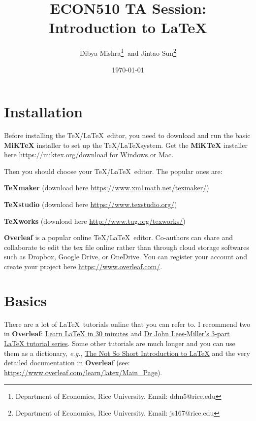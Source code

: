\documentclass[10pt]{extarticle}
\theoremstyle{theorem}
\theoremstyle{lemma}
\theoremstyle{proposition}
\theoremstyle{corollary}
\theoremstyle{assumption}
\theoremstyle{model}
\theoremstyle{property}
\theoremstyle{example}
\theoremstyle{algorithm}
\theoremstyle{definition}
\theoremstyle{axiom}
\theoremstyle{remark}
\begin{document}
\author{Dibya Mishra\thanks{%
Department of Economics, Rice University. Email: ddm5@rice.edu} $~$and Jintao Sun\thanks{%
Department of Economics, Rice University. Email: js167@rice.edu}}
\title{{\Large ECON510 TA Session: Introduction to \LaTeX}}
\date{\today}
\maketitle

\vspace*{-3em}


\section{Installation}

Before installing the \TeX/\LaTeX \ editor, you need to download and run the basic \textbf{MiKTeX} installer to set up the \TeX/\LaTeX system. Get the \textbf{MiKTeX} installer here \href{https://miktex.org/download}{https://miktex.org/download} for Windows or Mac.

Then you should choose your \TeX/\LaTeX \ editor. The popular ones are:

\textbf{TeXmaker} (download here \href{https://www.xm1math.net/texmaker/}{https://www.xm1math.net/texmaker/}) 

\textbf{TeXstudio} (download here \href{https://www.texstudio.org/}{https://www.texstudio.org/})

\textbf{TeXworks} (download here \href{http://www.tug.org/texworks/}{http://www.tug.org/texworks/})

\textbf{Overleaf} is a popular online \TeX/\LaTeX \ editor. Co-authors can share and collaborate to edit the tex file online rather than through cloud storage softwares such as Dropbox, Google Drive, or OneDrive. You can register your account and create your project here \href{https://www.overleaf.com/}{https://www.overleaf.com/}.


\section{Basics}

There are a lot of \LaTeX \ tutorials online that you can refer to. I recommend two in \textbf{Overleaf}: \href{https://www.overleaf.com/learn/latex/Learn_LaTeX_in_30_minutes}{Learn LaTeX in 30 minutes} and \href{https://www.overleaf.com/learn/latex/Free\_online\_introduction\_to\_LaTeX\_(part\_1)}{Dr John Lees-Miller's 3-part LaTeX tutorial series}. Some other tutorials are much longer and you can use them as a dictionary, \textit{e.g.}, \href{https://github.com/oetiker/lshort}{The Not So Short Introduction to LaTeX} and the very detailed documentation in \textbf{Overleaf} (see: \href{https://www.overleaf.com/learn/latex/Main\_Page}{https://www.overleaf.com/learn/latex/Main\_Page}).
\end{document}
